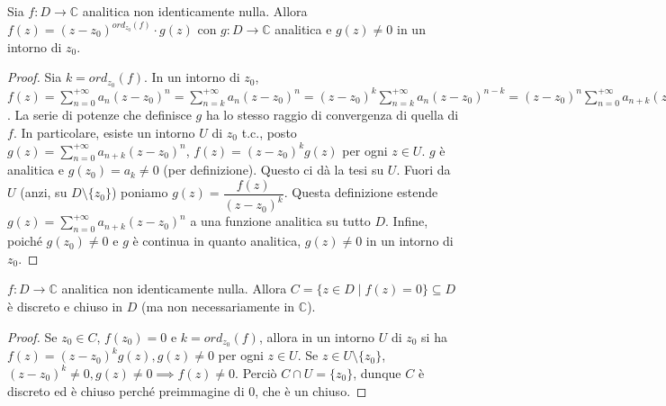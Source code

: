 \begin{prop}
  Sia $f:D \longrightarrow \mathbb{C}$ analitica non identicamente nulla. Allora $f(z)=(z-z_0)^{ord_{z_0}(f)}\cdot g(z)$ con $g:D \longrightarrow \mathbb{C}$ analitica e $g(z)\not=0$ in un intorno di $z_0$.
\end{prop}

\begin{proof}
  Sia $k=ord_{z_0}(f)$. In un intorno di $z_0$, $\displaystyle f(z)=\sum_{n=0}^{+\infty} a_n(z-z_0)^n=\sum_{n=k}^{+\infty} a_n(z-z_0)^n=(z-z_0)^k\sum_{n=k}^{+\infty} a_n(z-z_0)^{n-k}=(z-z_0)^n\sum_{n=0}^{+\infty} a_{n+k}(z-z_0)^n=(z-z_0)^kg(z)$. La serie di potenze che definisce $g$ ha lo stesso raggio di convergenza di quella di $f$.
  In particolare, esiste un intorno $U$ di $z_0$ t.c., posto $\displaystyle g(z)=\sum_{n=0}^{+\infty} a_{n+k}(z-z_0)^n$, $f(z)=(z-z_0)^kg(z)$ per ogni $z \in U$. $g$ è analitica e $g(z_0)=a_k \not=0$ (per definizione). Questo ci dà la tesi su $U$. Fuori da $U$ (anzi, su $D \setminus \{z_0\}$) poniamo $g(z)=\dfrac{f(z)}{(z-z_0)^k}$.
  Questa definizione estende $\displaystyle g(z)=\sum_{n=0}^{+\infty} a_{n+k}(z-z_0)^n$ a una funzione analitica su tutto $D$. Infine, poiché $g(z_0)\not=0$ e $g$ è continua in quanto analitica, $g(z)\not=0$ in un intorno di $z_0$.
\end{proof}

\begin{cor}
  $f:D \longrightarrow \mathbb{C}$ analitica non identicamente nulla.  Allora $C=\{z \in D \mid f(z)=0\} \subseteq D$ è discreto e chiuso in $D$ (ma non necessariamente in $\mathbb{C}$).
\end{cor}

\begin{proof}
  Se $z_0 \in C$, $f(z_0)=0$ e $k=ord_{z_0}(f)$, allora in un intorno $U$ di $z_0$ si ha $f(z)=(z-z_0)^kg(z), g(z) \not=0$ per ogni $z \in U$. Se $z \in U \setminus \{z_0\}$, $(z-z_0)^k\not=0, g(z) \not=0 \implies f(z) \not=0$.
  Perciò $C \cap U=\{z_0\}$, dunque $C$ è discreto ed è chiuso perché preimmagine di $0$, che è un chiuso. 
\end{proof}
